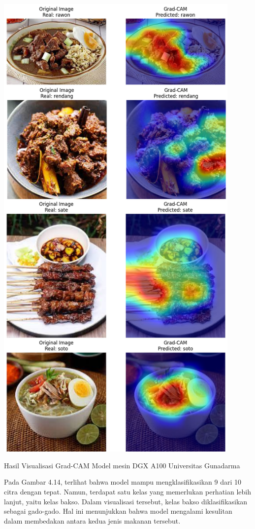 \begin{afigure}
    \includegraphics[height=0.9\textheight, width=0.9\textwidth, center]{images/grad-cam-3-dgx.png}
    \caption{Hasil Visualisasi Grad-CAM Model mesin DGX A100 Universitas Gunadarma}
    \label{fig:grad-cam-3-dgx}
\end{afigure}
\clearpage

Pada Gambar 4.14, terlihat bahwa model mampu mengklasifikasikan 9 dari 10 citra dengan tepat. Namun, terdapat satu kelas yang memerlukan perhatian lebih lanjut, yaitu kelas bakso. Dalam visualisasi tersebut, kelas bakso diklasifikasikan sebagai gado-gado. Hal ini menunjukkan bahwa model mengalami kesulitan dalam membedakan antara kedua jenis makanan tersebut.


